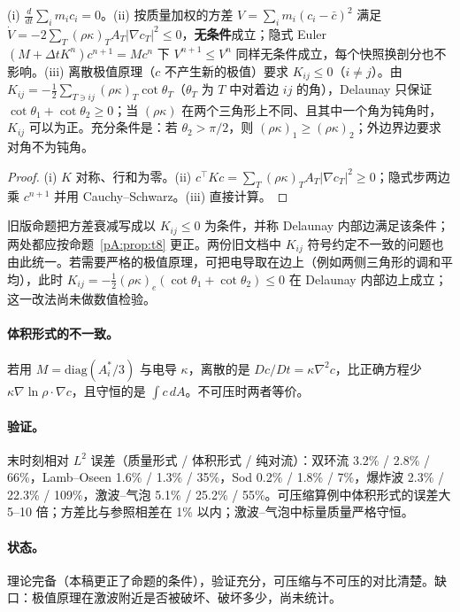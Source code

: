 \begin{proposition}[守恒、能量衰减与极值原理]\label{pA:prop:t8}
(i) $\tfrac{d}{dt}\sum_im_ic_i=0$。(ii) 按质量加权的方差 $V=\sum_im_i(c_i-\bar c)^2$ 满足 $\dot V=-2\sum_T(\rho\kappa)_TA_T|\nabla c_T|^2\le0$，\textbf{无条件}成立；隐式 Euler $(M+\Delta tK^n)c^{n+1}=Mc^n$ 下 $V^{n+1}\le V^n$ 同样无条件成立，每个快照换剖分也不影响。(iii) 离散极值原理（$c$ 不产生新的极值）要求 $K_{ij}\le0$（$i\ne j$）。由 $K_{ij}=-\tfrac12\sum_{T\ni ij}(\rho\kappa)_T\cot\theta_T$（$\theta_T$ 为 $T$ 中对着边 $ij$ 的角），Delaunay 只保证 $\cot\theta_1+\cot\theta_2\ge0$；当 $(\rho\kappa)$ 在两个三角形上不同、且其中一个角为钝角时，$K_{ij}$ 可以为正。充分条件是：若 $\theta_2>\pi/2$，则 $(\rho\kappa)_1\ge(\rho\kappa)_2$；外边界边要求对角不为钝角。
\end{proposition}
\begin{proof}
(i) $K$ 对称、行和为零。(ii) $c^\top Kc=\sum_T(\rho\kappa)_TA_T|\nabla c_T|^2\ge0$；隐式步两边乘 $c^{n+1}$ 并用 Cauchy–Schwarz。(iii) 直接计算。
\end{proof}
旧版命题把方差衰减写成以 $K_{ij}\le0$ 为条件，并称 Delaunay 内部边满足该条件；两处都应按命题~\ref{pA:prop:t8} 更正。两份旧文档中 $K_{ij}$ 符号约定不一致的问题也由此统一。若需要严格的极值原理，可把电导取在边上（例如两侧三角形的调和平均），此时 $K_{ij}=-\tfrac12(\rho\kappa)_e(\cot\theta_1+\cot\theta_2)\le0$ 在 Delaunay 内部边上成立；这一改法尚未做数值检验。

\paragraph{体积形式的不一致。}若用 $M=\mathrm{diag}(A^\ast_i/3)$ 与电导 $\kappa$，离散的是 $Dc/Dt=\kappa\nabla^2c$，比正确方程少 $\kappa\nabla\ln\rho\cdot\nabla c$，且守恒的是 $\int c\,dA$。不可压时两者等价。

\paragraph{验证。}末时刻相对 $L^2$ 误差（质量形式 / 体积形式 / 纯对流）：双环流 3.2\% / 2.8\% / 66\%，Lamb–Oseen 1.6\% / 1.3\% / 35\%，Sod 0.2\% / 1.8\% / 7\%，爆炸波 2.3\% / 22.3\% / 109\%，激波–气泡 5.1\% / 25.2\% / 55\%。可压缩算例中体积形式的误差大 5–10 倍；方差比与参照相差在 1\% 以内；激波–气泡中标量质量严格守恒。

\paragraph{状态。}理论完备（本稿更正了命题的条件），验证充分，可压缩与不可压的对比清楚。缺口：极值原理在激波附近是否被破坏、破坏多少，尚未统计。

